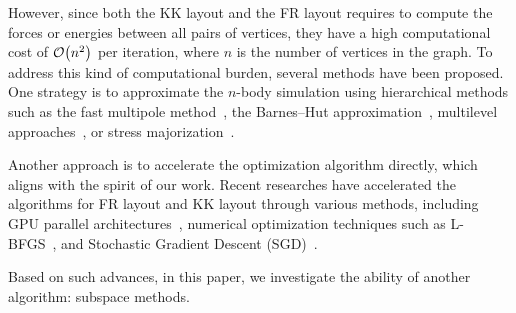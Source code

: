 \documentclass[dvipdfmx,journal]{IEEEtran}
\begin{document}
However, since both the KK layout and the FR layout requires to compute the forces or energies between all pairs of vertices, they have a high computational cost of $\order{n^2}$ per iteration, where $n$ is the number of vertices in the graph. To address this kind of computational burden, several methods have been proposed. One strategy is to approximate the $n$-body simulation using hierarchical methods such as the fast multipole method~\cite{greengardFastAlgorithmParticle1987}, the Barnes--Hut approximation~\cite{barnesHierarchicalLogForcecalculation1986}, multilevel approaches~\cite{Hu2006EfficientHF}, or stress majorization~\cite{gansnerGraphDrawingStress2005}.

Another approach is to accelerate the optimization algorithm directly, which aligns with the spirit of our work. Recent researches have accelerated the algorithms for FR layout and KK layout through various methods, including GPU parallel architectures~\cite{gajdosParallelFruchtermanReingold2016}, numerical optimization techniques such as L-BFGS~\cite{6183577}, and Stochastic Gradient Descent (SGD)~\cite{8419285}.

Based on such advances, in this paper, we investigate the ability of another algorithm: subspace methods.
\end{document}
